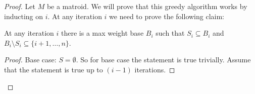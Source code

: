 \begin{algorithm}[H]
	\DontPrintSemicolon
	\caption{($E,W$)}
\end{algorithm}
\begin{proof}	Let $M$ be a matroid. We will prove that this greedy algorithm works by inducting on $i$. At any iteration $i$ we need to prove the following claim:
	
\begin{claimwidth}
			
	\begin{claim}{}{}
		At any iteration $i$ there is a max weight base $B_i$ such that $S_i\subseteq B_i$ and $B_i\setminus S_i\subseteq \{i+1,\dots, n\}$.
	\end{claim}
	
\begin{proof}
	Base case: $S=\emptyset$. So for base case the statement is true trivially. Assume that the statement is true up to $(i-1)$ iterations.\parinn
	

\end{proof}
\end{claimwidth}
\end{proof}
